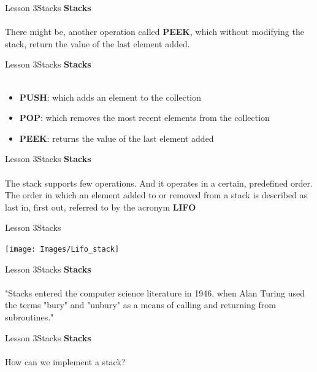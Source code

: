 \documentclass[aspectratio=1610]{beamer}
\begin{document}
\begin{frame}{Lesson 3}{Stacks}
\LARGE
\textbf{Stacks}\\~\\
There might be, another operation called \textbf{PEEK}, which without
modifying the stack, return the value of the last element added.
\end{frame}


\begin{frame}{Lesson 3}{Stacks}
\LARGE
\textbf{Stacks}\\~\\
\begin{itemize}
    \item \textbf{PUSH}: which adds an element to the collection 
    \item \textbf{POP}: which removes the most recent elements from the collection
    \item \textbf{PEEK}: returns the value of the last element added
\end{itemize}
\end{frame}


\begin{frame}{Lesson 3}{Stacks}
\LARGE
\textbf{Stacks}\\~\\
The stack supports few operations. And it operates in a certain,
predefined order. The order in which an element added to or removed
from a stack is described as last in, first out,
referred to by the acronym \textbf{LIFO}
\end{frame}


\begin{frame}{Lesson 3}{Stacks}
\begin{center}
\texttt{[image: Images/Lifo\_stack]}
\end{center}
\end{frame}


\begin{frame}{Lesson 3}{Stacks}
\LARGE
\textbf{Stacks}\\~\\
"Stacks entered the computer science literature in 1946, when
\alert{Alan Turing} used the terms "bury" and "unbury" as a means of
calling and returning from subroutines."
\end{frame}



\begin{frame}{Lesson 3}{Stacks}
\Huge 
\textbf{Stacks}\\~\\
How can we implement a stack? 
\end{frame}
\end{document}
